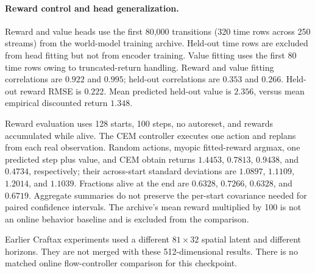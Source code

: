 \paragraph{Reward control and head generalization.}
Reward and value heads use the first 80,000 transitions (320 time rows across 250 streams) from the
world-model training archive. Held-out time rows are excluded from head fitting but not from encoder
training. Value fitting uses the first 80 time rows owing to truncated-return handling. Reward and
value fitting correlations are $0.922$ and $0.995$; held-out correlations are $0.353$ and $0.266$.
Held-out reward RMSE is $0.222$. Mean predicted held-out value is $2.356$, versus mean empirical
discounted return $1.348$.

Reward evaluation uses 128 starts, 100 steps, no autoreset, and rewards accumulated while alive.
The CEM controller executes one action and replans from each real observation. Random actions,
myopic fitted-reward argmax, one predicted step plus value, and CEM obtain returns
$1.4453$, $0.7813$, $0.9438$, and $0.4734$, respectively; their across-start standard deviations
are $1.0897$, $1.1109$, $1.2014$, and $1.1039$. Fractions alive at the end are $0.6328$, $0.7266$,
$0.6328$, and $0.6719$. Aggregate summaries do not preserve the per-start covariance needed for
paired confidence intervals. The archive's mean reward multiplied by 100 is not an online behavior
baseline and is excluded from the comparison.

Earlier Craftax experiments used a different $81\times32$ spatial latent and different horizons.
They are not merged with these 512-dimensional results. There is no matched online flow-controller
comparison for this checkpoint.

